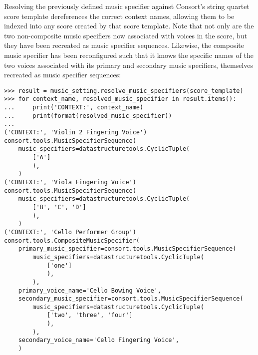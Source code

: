 \noindent Resolving the previously defined music specifier against Consort's
string quartet score template dereferences the correct context names, allowing
them to be indexed into any score created by that score template. Note that not
only are the two non-composite music specifiers now associated with voices in
the score, but they have been recreated as music specifier sequences. Likewise,
the composite music specifier has been reconfigured such that it knows the
specific names of the two voices associated with its primary and secondary
music specifiers, themselves recreated as music specifier sequences:

\begin{comment}
<abjad>
result = music_setting.resolve_music_specifiers(score_template)
for context_name, resolved_music_specifier in result.items():
    print('CONTEXT:', context_name)
    print(format(resolved_music_specifier))

</abjad>
\end{comment}

\begin{abjadbookoutput}
\begin{singlespacing}
\vspace{-0.5\baselineskip}
\begin{verbatim}
>>> result = music_setting.resolve_music_specifiers(score_template)
>>> for context_name, resolved_music_specifier in result.items():
...     print('CONTEXT:', context_name)
...     print(format(resolved_music_specifier))
...
('CONTEXT:', 'Violin 2 Fingering Voice')
consort.tools.MusicSpecifierSequence(
    music_specifiers=datastructuretools.CyclicTuple(
        ['A']
        ),
    )
('CONTEXT:', 'Viola Fingering Voice')
consort.tools.MusicSpecifierSequence(
    music_specifiers=datastructuretools.CyclicTuple(
        ['B', 'C', 'D']
        ),
    )
('CONTEXT:', 'Cello Performer Group')
consort.tools.CompositeMusicSpecifier(
    primary_music_specifier=consort.tools.MusicSpecifierSequence(
        music_specifiers=datastructuretools.CyclicTuple(
            ['one']
            ),
        ),
    primary_voice_name='Cello Bowing Voice',
    secondary_music_specifier=consort.tools.MusicSpecifierSequence(
        music_specifiers=datastructuretools.CyclicTuple(
            ['two', 'three', 'four']
            ),
        ),
    secondary_voice_name='Cello Fingering Voice',
    )
\end{verbatim}
\end{singlespacing}
\end{abjadbookoutput}

